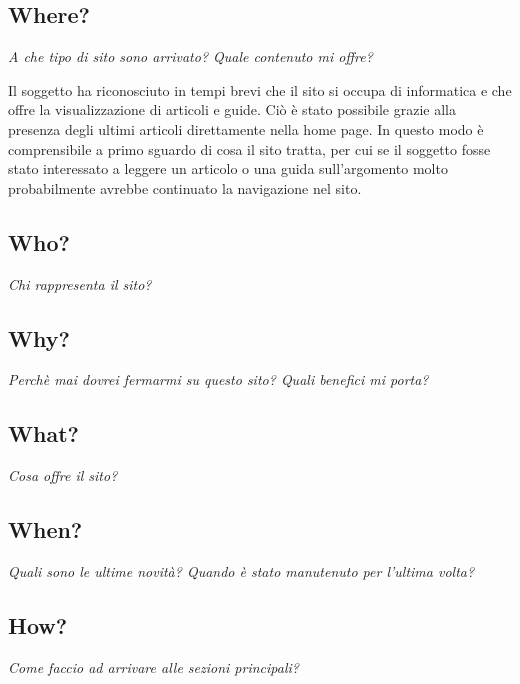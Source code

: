 \subsection{Where?}

\begin{center}

\textit{A che tipo di sito sono arrivato? Quale contenuto mi offre?}

\end{center}

Il soggetto ha riconosciuto in tempi brevi che il sito si occupa di informatica e che offre la visualizzazione di articoli e guide. Ciò è stato possibile grazie alla presenza degli ultimi articoli direttamente nella home page. In questo modo è comprensibile a primo sguardo di cosa il sito tratta, per cui se il soggetto fosse stato interessato a leggere un articolo o una guida sull'argomento molto probabilmente avrebbe continuato la navigazione nel sito.

\subsection{Who?}

\textit{Chi rappresenta il sito?}

\subsection{Why?}

\textit{Perchè mai dovrei fermarmi su questo sito? Quali benefici mi porta?}

\subsection{What?}

\textit{Cosa offre il sito?}

\subsection{When?}

\textit{Quali sono le ultime novità? Quando è stato manutenuto per l'ultima volta?}

\subsection{How?}

\textit{Come faccio ad arrivare alle sezioni principali?}



